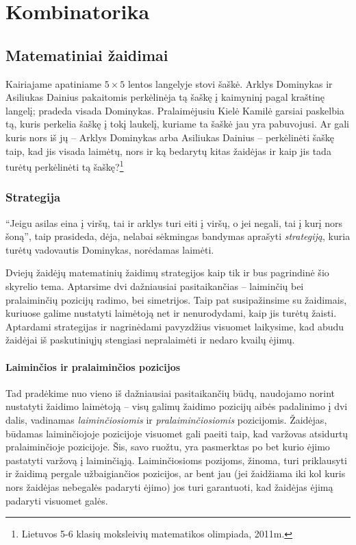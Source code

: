 
\chapter{Kombinatorika}
\thispagestyle{empty}

\section{Matematiniai žaidimai}

Kairiajame apatiniame $5\times 5$ lentos langelyje stovi šaškė. Arklys
Dominykas ir Asiliukas Dainius pakaitomis perkėlinėja tą šaškę į kaimyninį
pagal kraštinę langelį; pradeda visada Dominykas. Pralaimėjusiu Kielė
Kamilė garsiai paskelbia tą, kuris perkelia šaškę į tokį laukelį, kuriame
ta šaškė jau yra pabuvojusi. Ar gali kuris nors iš jų – Arklys Dominykas
arba Asiliukas Dainius – perkėlinėti šaškę taip, kad jis visada laimėtų,
nors ir ką bedarytų kitas žaidėjas ir kaip jis tada turėtų perkėlinėti tą
šaškę?\footnote{Lietuvos 5-6 klasių moksleivių matematikos olimpiada,
2011m.}

\subsection{Strategija}

``Jeigu asilas eina į viršų, tai ir arklys turi eiti į viršų, o jei negali,
tai į kurį nors šoną'', taip prasideda, dėja, nelabai sėkmingas bandymas
aprašyti \emph{strategiją}, kuria turėtų vadovautis Dominykas, norėdamas
laimėti. 

Dviejų žaidėjų matematinių žaidimų strategijos kaip tik ir bus pagrindinė
šio skyrelio tema. Aptarsime dvi dažniausiai pasitaikančias -- laiminčių
bei pralaiminčių pozicijų radimo, bei simetrijos. Taip pat susipažinsime su
žaidimais, kuriuose galime nustatyti laimėtoją net ir nenurodydami, kaip
jis turėtų žaisti. Aptardami strategijas ir nagrinėdami pavyzdžius visuomet
laikysime, kad abudu žaidėjai iš paskutiniųjų stengiasi nepralaimėti ir
nedaro kvailų ėjimų. 

\subsubsection{Laiminčios ir pralaiminčios pozicijos}

Tad pradėkime nuo vieno iš dažniausiai pasitaikančių būdų, naudojamo norint
nustatyti žaidimo laimėtoją -- visų galimų žaidimo pozicijų aibės
padalinimo į dvi dalis, vadinamas \emph{laiminčiosiomis} ir
\emph{pralaiminčiosiomis} pozicijomis. Žaidėjas, būdamas
laiminčiojoje pozicijoje visuomet gali paeiti taip, kad varžovas atsidurtų
pralaiminčioje pozicijoje. Šis, savo ruožtu, yra pasmerktas po bet kurio
ėjimo pastatyti varžovą į laiminčiąją. Laiminčiosioms pozijoms, žinoma,
turi priklausyti ir žaidimą pergale užbaigiančios pozicijos, ar bent jau (jei
žaidžiama iki kol kuris nors žaidėjas nebegalės padaryti ėjimo) jos turi
garantuoti, kad žaidėjas ėjimą padaryti visuomet galės. 

